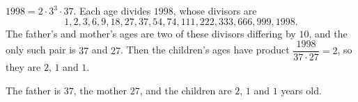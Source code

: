 $1998=2\cdot3^3\cdot37$. Each age divides $1998$, whose divisors are
\[1,2,3,6,9,18,27,37,54,74,111,222,333,666,999,1998.\]
The father's and mother's ages are two of these divisors differing by $10$, and the only such pair is $37$ and $27$. Then the children's ages have product $\dfrac{1998}{37\cdot27}=2$, so they are $2$, $1$ and $1$.

The father is $\boxed{37}$, the mother $27$, and the children are $2$, $1$ and $1$ years old.
